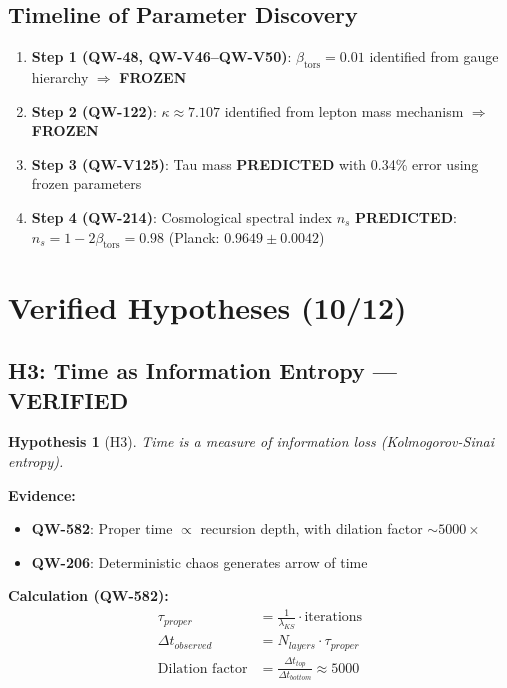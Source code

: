 \documentclass[11pt, a4paper]{article}
\newtheorem{hypothesis}{Hypothesis}[section]
\theoremstyle{remark}
\newcommand{\betators}{\beta_{\text{tors}}}
\newcommand{\QW}[1]{\textbf{QW-#1}}
\begin{document}
\subsection{Timeline of Parameter Discovery}

\begin{enumerate}
    \item \textbf{Step 1 (\QW{48}, \QW{V46}--\QW{V50})}: $\betators = 0.01$ identified from gauge hierarchy $\Rightarrow$ \textbf{FROZEN}
    
    \item \textbf{Step 2 (\QW{122})}: $\kappa \approx 7.107$ identified from lepton mass mechanism $\Rightarrow$ \textbf{FROZEN}
    
    \item \textbf{Step 3 (\QW{V125})}: Tau mass \textbf{PREDICTED} with 0.34\% error using frozen parameters
    
    \item \textbf{Step 4 (\QW{214})}: Cosmological spectral index $n_s$ \textbf{PREDICTED}: $n_s = 1 - 2\betators = 0.98$ (Planck: $0.9649 \pm 0.0042$)
\end{enumerate}

\section{Verified Hypotheses (10/12)}

\subsection{H3: Time as Information Entropy --- VERIFIED}

\begin{hypothesis}[H3]
Time is a measure of information loss (Kolmogorov-Sinai entropy).
\end{hypothesis}

\textbf{Evidence:}
\begin{itemize}
    \item \QW{582}: Proper time $\propto$ recursion depth, with dilation factor $\sim 5000\times$
    \item \QW{206}: Deterministic chaos generates arrow of time
\end{itemize}

\textbf{Calculation (\QW{582}):}
\begin{align}
\tau_{proper} &= \frac{1}{\lambda_{KS}} \cdot \text{iterations} \\
\Delta t_{observed} &= N_{layers} \cdot \tau_{proper} \\
\text{Dilation factor} &= \frac{\Delta t_{top}}{\Delta t_{bottom}} \approx 5000
\end{align}
\end{document}
